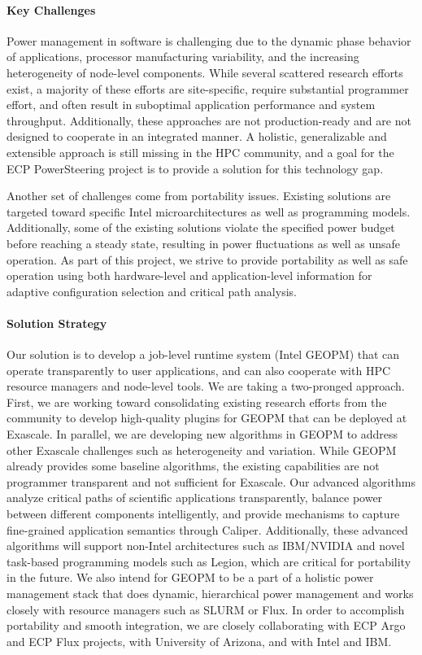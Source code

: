 \paragraph{Key Challenges}
Power management in software is challenging due to the dynamic phase behavior of applications, processor manufacturing variability, and the increasing heterogeneity of node-level components. While several scattered research efforts exist, a majority of these efforts are site-specific, require substantial programmer effort, and often result in suboptimal application performance and system throughput. Additionally, these approaches are not production-ready and are not designed to cooperate in an integrated manner. A holistic, generalizable and extensible approach is still missing in the HPC community, and a goal for the ECP PowerSteering project is to provide a solution for this technology gap. 

Another set of challenges come from portability issues. Existing solutions are targeted toward specific Intel microarchitectures as well as programming models. Additionally, some of the existing solutions  violate the specified power budget before reaching a steady state, resulting in power fluctuations as well as unsafe operation. As part of this project, we strive to provide portability as well as safe operation using both hardware-level and application-level information for adaptive configuration selection and critical path analysis.

\paragraph{Solution Strategy}
Our solution is to develop a job-level runtime system (Intel GEOPM) that can operate transparently to user applications, and can also cooperate with HPC resource managers and node-level tools. We are taking a two-pronged approach. First, we are working toward consolidating existing research efforts from the community to develop high-quality plugins for GEOPM that can be deployed at Exascale. In parallel, we are developing new algorithms in GEOPM to address other Exascale challenges such as heterogeneity and variation. While GEOPM already provides some baseline algorithms, the existing capabilities are not programmer transparent and not sufficient for Exascale. Our advanced algorithms analyze critical paths of scientific applications transparently, balance power between different components intelligently, and provide mechanisms to capture fine-grained application semantics through Caliper. Additionally, these advanced algorithms will support non-Intel architectures such as IBM/NVIDIA and novel task-based programming models such as Legion, which are critical for portability in the future. We also intend for GEOPM to be a part of a holistic power management stack that does dynamic, hierarchical power management and works closely with resource managers such as SLURM or Flux.  In order to accomplish portability and smooth integration, we are closely collaborating with ECP Argo and ECP Flux projects, with University of Arizona, and with Intel and IBM. 

